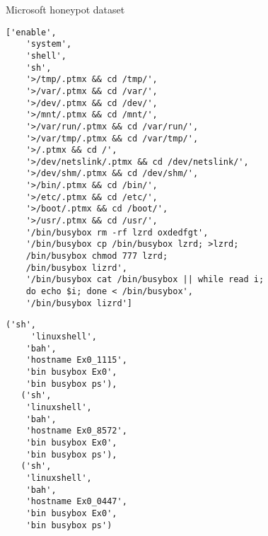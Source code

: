\begin{table}[h]
    \centering
    
    \caption{Microsoft honeypot dataset}
    \label{tab:headdf}
\end{table}

\begin{lstlisting}[caption={Sample sessions}, label={lst:sessions}]
    ['enable',
    'system',
    'shell',
    'sh',
    '>/tmp/.ptmx && cd /tmp/',
    '>/var/.ptmx && cd /var/',
    '>/dev/.ptmx && cd /dev/',
    '>/mnt/.ptmx && cd /mnt/',
    '>/var/run/.ptmx && cd /var/run/',
    '>/var/tmp/.ptmx && cd /var/tmp/',
    '>/.ptmx && cd /',
    '>/dev/netslink/.ptmx && cd /dev/netslink/',
    '>/dev/shm/.ptmx && cd /dev/shm/',
    '>/bin/.ptmx && cd /bin/',
    '>/etc/.ptmx && cd /etc/',
    '>/boot/.ptmx && cd /boot/',
    '>/usr/.ptmx && cd /usr/',
    '/bin/busybox rm -rf lzrd oxdedfgt',
    '/bin/busybox cp /bin/busybox lzrd; >lzrd; 
    /bin/busybox chmod 777 lzrd; 
    /bin/busybox lizrd',
    '/bin/busybox cat /bin/busybox || while read i; 
    do echo $i; done < /bin/busybox',
    '/bin/busybox lizrd']
\end{lstlisting}

\begin{lstlisting}[caption={Sample sessions}, label={lst:sessions}]
    ('sh',
     'linuxshell',
    'bah',
    'hostname Ex0_1115',
    'bin busybox Ex0',
    'bin busybox ps'),
   ('sh',
    'linuxshell',
    'bah',
    'hostname Ex0_8572',
    'bin busybox Ex0',
    'bin busybox ps'),
   ('sh',
    'linuxshell',
    'bah',
    'hostname Ex0_0447',
    'bin busybox Ex0',
    'bin busybox ps')
\end{lstlisting}
